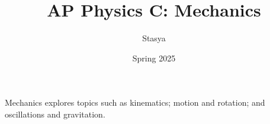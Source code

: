 \documentclass[10pt,a4paper,oneside]{book}
\title{AP Physics C: Mechanics}
\author{Stasya}
\date{Spring 2025}
\begin{document}
\maketitle
\bigbreak
\begin{center}
    Mechanics explores topics such as kinematics; motion and rotation; and oscillations and gravitation.
\end{center}
\bigbreak
\tableofcontents







\end{document}
